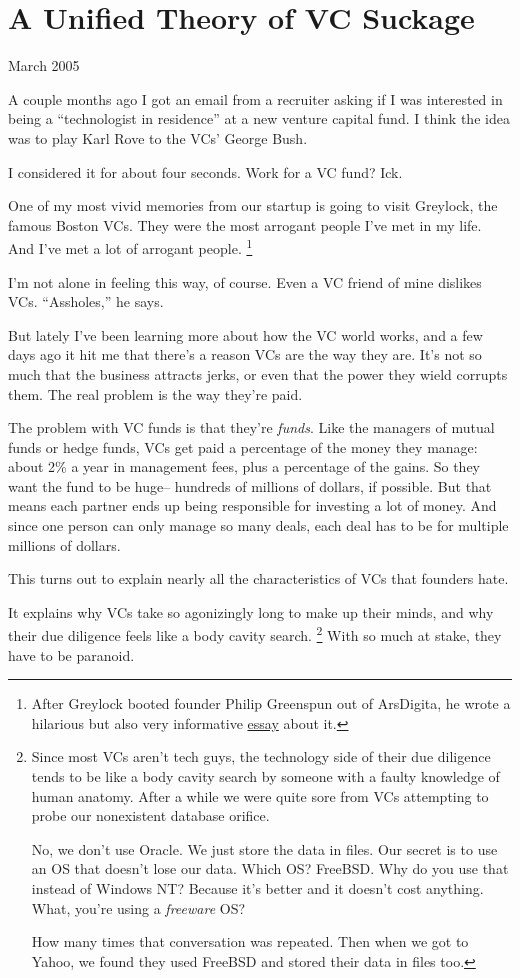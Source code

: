 \chapter{A Unified Theory of VC Suckage}

March 2005

A couple months ago I got an email from a recruiter asking if I was
interested in being a ``technologist in residence'' at a new venture
capital fund. I think the idea was to play Karl Rove to the VCs' George
Bush.

I considered it for about four seconds. Work for a VC fund? Ick.

One of my most vivid memories from our startup is going to visit
Greylock, the famous Boston VCs. They were the most arrogant people I've
met in my life. And I've met a lot of arrogant people. \footnote{After Greylock booted founder Philip Greenspun out of ArsDigita,
he wrote a hilarious but also very informative
\href{http://www.waxy.org/random/arsdigita/}{essay} about it.}

I'm not alone in feeling this way, of course. Even a VC friend of mine
dislikes VCs. ``Assholes,'' he says.

But lately I've been learning more about how the VC world works, and a
few days ago it hit me that there's a reason VCs are the way they are.
It's not so much that the business attracts jerks, or even that the
power they wield corrupts them. The real problem is the way they're
paid.

The problem with VC funds is that they're \emph{funds}. Like the
managers of mutual funds or hedge funds, VCs get paid a percentage of
the money they manage: about 2\% a year in management fees, plus a
percentage of the gains. So they want the fund to be huge-- hundreds of
millions of dollars, if possible. But that means each partner ends up
being responsible for investing a lot of money. And since one person can
only manage so many deals, each deal has to be for multiple millions of
dollars.

This turns out to explain nearly all the characteristics of VCs that
founders hate.

It explains why VCs take so agonizingly long to make up their minds, and
why their due diligence feels like a body cavity search. \footnote{Since most VCs aren't tech guys, the technology side of their
due diligence tends to be like a body cavity search by someone with a
faulty knowledge of human anatomy. After a while we were quite sore from
VCs attempting to probe our nonexistent database orifice.

No, we don't use Oracle. We just store the data in files. Our secret is
to use an OS that doesn't lose our data. Which OS? FreeBSD. Why do you
use that instead of Windows NT? Because it's better and it doesn't cost
anything. What, you're using a \emph{freeware} OS?

How many times that conversation was repeated. Then when we got to
Yahoo, we found they used FreeBSD and stored their data in files too.} With so
much at stake, they have to be paranoid.

